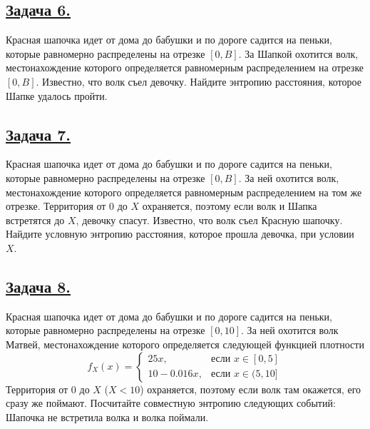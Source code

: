 \subsection*{\hyperref[sec:sol_problem6]{Задача 6.}}\label{sec:problem6} Красная шапочка идет от дома до бабушки и по дороге садится на пеньки, которые равномерно распределены на отрезке $[0, B]$. За Шапкой охотится волк, местонахождение которого определяется равномерным распределением на отрезке $[0, B]$. Известно, что волк съел девочку. Найдите энтропию расстояния, которое Шапке удалось пройти. 

\subsection*{\hyperref[sec:sol_problem7]{Задача 7.}}\label{sec:problem7} Красная шапочка идет от дома до бабушки и по дороге садится на пеньки, которые равномерно распределены на отрезке $[0, B]$. За ней охотится волк, местонахождение которого определяется равномерным распределением на том же отрезке. Территория от 0 до $X$ охраняется, поэтому если волк и Шапка встретятся до $X$, девочку спасут. Известно, что волк съел Красную шапочку. Найдите условную энтропию расстояния, которое прошла девочка, при условии $X$.

\subsection*{\hyperref[sec:sol_problem8]{Задача 8.}}\label{sec:problem8} Красная шапочка идет от дома до бабушки и по дороге садится на пеньки, которые равномерно распределены на отрезке $[0, 10]$. За ней охотится волк Матвей, местонахождение которого определяется следующей функцией плотности 
\begin{equation*}
f_X(x) = 
 \begin{cases}
   25x, &\text{если $x \in [0, 5]$}\\
   10 - 0.016x, &\text{если $x \in (5, 10]$}
 \end{cases}
\end{equation*}
Территория от 0 до $X$ ($X<10$) охраняется, поэтому если волк там окажется, его сразу же поймают. Посчитайте совместную энтропию следующих событий: Шапочка не встретила волка и волка поймали. 

